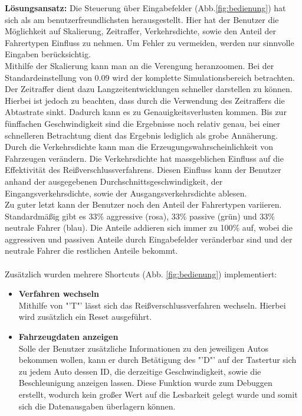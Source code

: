 \begin{addmargin}[25pt]{0pt}
	\item \textbf{Lösungsansatz:} Die Steuerung über Eingabefelder (Abb.\ref{fig:bedienung}) hat sich als am benutzerfreundlichsten herausgestellt. Hier hat der Benutzer die Möglichkeit auf Skalierung, Zeitraffer, Verkehrsdichte, sowie den Anteil der Fahrertypen Einfluss zu nehmen. Um Fehler zu vermeiden, werden nur sinnvolle Eingaben berücksichtig.\\ 
Mithilfe der Skalierung kann man an die Verengung heranzoomen. Bei der Standardeinstellung von 0.09 wird der komplette Simulationsbereich betrachten.\\ 
Der Zeitraffer dient dazu Langzeitentwicklungen schneller darstellen zu können. Hierbei ist jedoch zu beachten, dass durch die Verwendung des Zeitraffers die Abtastrate sinkt. Dadurch kann es zu Genauigkeitsverlusten kommen. Bis zur fünffachen Geschwindigkeit sind die Ergebnisse noch relativ genau, bei einer schnelleren Betrachtung dient das Ergebnis lediglich als grobe Annäherung.\\
Durch die Verkehrsdichte kann man die Erzeugungswahrscheinlichkeit von Fahrzeugen verändern. Die Verkehrsdichte hat massgeblichen Einfluss auf die Effektivität des Reißverschlussverfahrens. Diesen Einfluss kann der Benutzer anhand der ausgegebenen Durchschnittsgeschwindigkeit, der Eingangsverkehrsdichte, sowie der Ausgangsverkehrsdichte ablesen.\\
Zu guter letzt kann der Benutzer noch den Anteil der Fahrertypen variieren. Standardmäßig gibt es 33\% aggressive (rosa), 33\% passive (grün) und 33\% neutrale Fahrer (blau). Die Anteile addieren sich immer zu 100\% auf, wobei die aggressiven und passiven Anteile durch Eingabefelder veränderbar sind und der neutrale Fahrer die restlichen Anteile bekommt.\\\\
	Zusätzlich wurden mehrere Shortcuts (Abb. \ref{fig:bedienung}) implementiert:
	\begin{itemize}
		\item \textbf{Verfahren wechseln}\\
		Mithilfe von "'T"' lässt sich das Reißverschlussverfahren wechseln. Hierbei wird zusätzlich ein Reset ausgeführt.
		\item \textbf{Fahrzeugdaten anzeigen}\\
		Solle der Benutzer zusätzliche Informationen zu den jeweiligen Autos bekommen wollen, kann er durch Betätigung des "'D"' auf der Tastertur sich zu jedem Auto dessen ID, die derzeitige Geschwindigkeit, sowie die Beschleunigung anzeigen lassen. Diese Funktion wurde zum Debuggen erstellt, wodurch kein großer Wert auf die Lesbarkeit gelegt wurde und somit sich die Datenausgaben überlagern können.

\end{itemize}
\end{addmargin}
